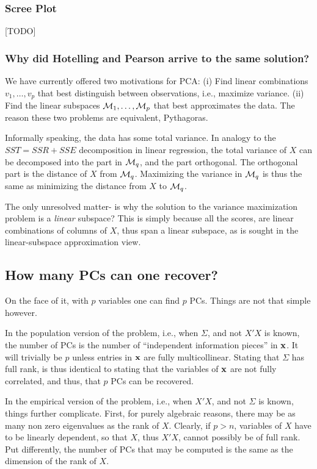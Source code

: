 \documentclass[12pt,a4paper]{article}
\begin{document}
\subsubsection{Scree Plot}
\label{sec:scree_plot}
[TODO]




\subsubsection{Why did Hotelling and Pearson arrive to the same solution?}
\label{sec:pca_intuition}

We have currently offered two motivations for PCA: 
(i) Find linear combinations $v_1,\dots,v_p$ that best distinguish between observations, i.e., maximize variance. 
(ii) Find the linear subspaces $\mathcal{M}_1,\dots,\mathcal{M}_p$ that best approximates the data.
The reason these two problems are equivalent, Pythagoras.

Informally speaking, the data has some total variance. 
In analogy to the $SST=SSR+SSE$ decomposition in linear regression, the total variance of $X$ can be decomposed into the part in $\mathcal{M}_q$, and the part orthogonal. 
The orthogonal part is the distance of $X$ from $\mathcal{M}_q$. 
Maximizing the variance in $\mathcal{M}_q$ is thus the same as minimizing the distance from $X$ to $\mathcal{M}_q$. 

The only unresolved matter- is why the solution to the variance maximization problem is a \emph{linear} subspace?
This is simply because all the scores, are linear combinations of columns of $X$, thus span a linear subspace, as is sought in the linear-subspace approximation view. 




\subsection{How many PCs can one recover?}
\label{sec:how-many-pcs}
On the face of it, with $p$ variables one can find $p$ PCs. 
Things are not that simple however.

In the population version of the problem, i.e., when $\Sigma$, and not $X'X$ is known, the number of PCs is the number of ``independent information pieces'' in $\mathbf{x}$. 
It will trivially be $p$ unless entries in $\mathbf{x}$ are fully multicollinear. 
Stating that $\Sigma$ has full rank, is thus identical to stating that the variables of $\mathbf{x}$ are not fully correlated, and thus, that $p$ PCs can be recovered. 

In the empirical version of the problem, i.e., when $X'X$, and not $\Sigma$ is known, things further complicate.
First, for purely algebraic reasons, there may be as many non zero eigenvalues as the rank of $X$.
Clearly, if $p>n$, variables of $X$ have to be linearly dependent, so that $X$, thus $X'X$, cannot possibly be of full rank.
Put differently, the number of PCs that may be computed is the same as the dimension of the rank of $X$. 
\end{document}
